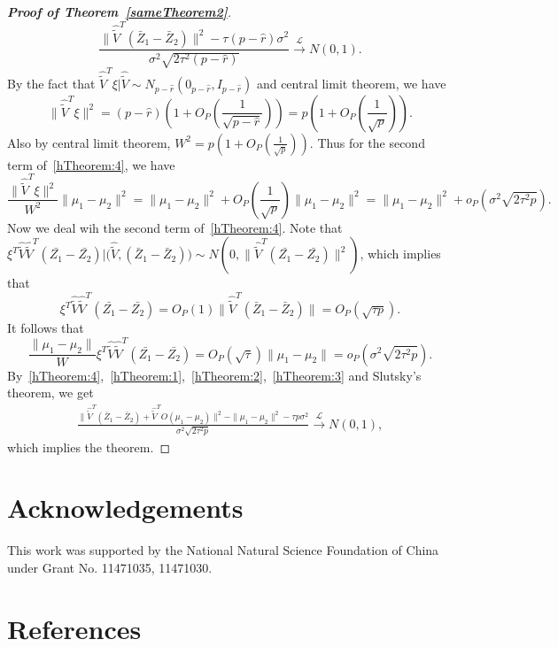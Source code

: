 \documentclass[review]{elsarticle}
\theoremstyle{plain}
\theoremstyle{definition}
\theoremstyle{remark}
\begin{document}
\begin{proof}[\textbf{Proof of Theorem~\ref{sameTheorem2}}]
    \begin{equation}\label{hTheorem:1}
    \frac{\|\hat{\tilde{V}}^T(\bar{Z}_1-\bar{Z}_2)\|^2-\tau(p-\hat{r})\sigma^2}{\sigma^2\sqrt{2\tau^2(p-\hat{r})}}\xrightarrow{\mathcal{L}}N(0,1).
    \end{equation}
    By the fact that $\hat{\tilde{V}}^T\xi|\hat{\tilde{V}}\sim N_{p-\hat{r}}(0_{p-\hat{r}},I_{p-\hat{r}})$ and central limit theorem, we have
    $$\|\hat{\tilde{V}}^T\xi\|^2=(p-\hat{r})(1+O_P(\frac{1}{\sqrt{p-\hat{r}}}))=p(1+O_P(\frac{1}{\sqrt{p}})).$$
    Also by central limit theorem, $W^2=p(1+O_P(\frac{1}{\sqrt{p}}))$.
    Thus for the second term of~\eqref{hTheorem:4}, we have
    \begin{equation}\label{hTheorem:2}
    \frac{\|\hat{\tilde{V}}^T\xi\|^2}{W^2}\|\mu_1-\mu_2\|^2=\|\mu_1-\mu_2\|^2+O_P(\frac{1}{\sqrt{p}})\|\mu_1-\mu_2\|^2
        =\|\mu_1-\mu_2\|^2+o_P(\sigma^2\sqrt{2\tau^2 p}).
    \end{equation}
    Now we deal wih the second term of~\eqref{hTheorem:4}.
    Note that $\xi^T\hat{\tilde{V}}\hat{\tilde{V}}^T(\bar{Z_1}-\bar{Z_2})\big|\big(\hat{\tilde{V}},(\bar{Z}_1-\bar{Z}_2)\big)\sim N(0,\|\hat{\tilde{V}}^T(\bar{Z_1}-\bar{Z_2})\|^2)$, which implies that
    $$
    \xi^T\hat{\tilde{V}}\hat{\tilde{V}}^T(\bar{Z_1}-\bar{Z_2})
    =O_P(1)\|\hat{\tilde{V}}^T(\bar{Z}_1-\bar{Z}_2)\|=O_P(\sqrt{\tau p}).
    $$
    It follows that
    \begin{equation}\label{hTheorem:3}
    \frac{\|\mu_1-\mu_2\|}{W}\xi^T\hat{\tilde{V}}\hat{\tilde{V}}^T(\bar{Z_1}-\bar{Z_2})=O_P(\sqrt{\tau})\|\mu_1-\mu_2\|
        =o_P(\sigma^2\sqrt{2\tau^2 p}).
    \end{equation}
    By~\eqref{hTheorem:4},~\eqref{hTheorem:1},~\eqref{hTheorem:2},~\eqref{hTheorem:3} and Slutsky's theorem, we get
\begin{equation*}
    \begin{aligned}
        \frac{\|\hat{\tilde{V}}^T (\bar{Z}_1-\bar{Z}_2)+\hat{\tilde{V}}^T O(\mu_1-\mu_2)\|^2-\|\mu_1-\mu_2\|^2-\tau p \sigma^2}{\sigma^2\sqrt{2\tau^2 p}} \xrightarrow{\mathcal{L}}N(0,1),
    \end{aligned}
\end{equation*}
which implies the theorem.

\end{proof}





\section*{Acknowledgements}
This work was supported by the National Natural Science Foundation of China under Grant No. 11471035, 11471030.


\section*{References}


\end{document}
